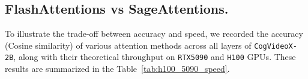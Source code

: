 \subsection{FlashAttentions vs SageAttentions.}

\begin{table}[H]
\centering
\vspace{-.5em}
\caption{Speed–accuracy trade-off of different attention methods.}
\label{tab:tradeoff}
\label{tab:h100_5090_speed}
\end{table}

To illustrate the trade-off between accuracy and speed, we recorded the accuracy (Cosine similarity) of various attention methods across all layers of \texttt{CogVideoX-2B}, along with their theoretical throughput on \texttt{RTX5090} and \texttt{H100} GPUs. These results are summarized in the Table~\ref{tab:h100_5090_speed}.




